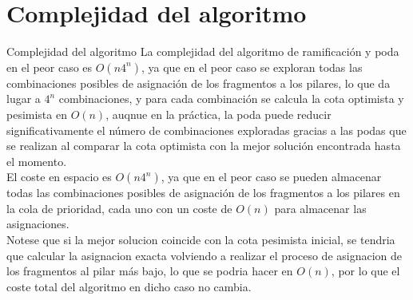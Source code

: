 \documentclass[aspectratio=169]{beamer}
\begin{document}
\section{Complejidad del algoritmo}
\begin{frame}{Complejidad del algoritmo}
    La complejidad del algoritmo de ramificación y poda en el peor caso es $O(n 4^n)$, ya que en el peor caso se exploran todas las combinaciones posibles de asignación de los fragmentos a los pilares, lo que da lugar a $4^n$ combinaciones, y para cada combinación se calcula la cota optimista y pesimista en $O(n)$, auqnue en la práctica, la poda puede reducir significativamente el número de combinaciones exploradas gracias a las podas que se realizan al comparar la cota optimista con la mejor solución encontrada hasta el momento.\\
    El coste en espacio es $O(n4^n)$, ya que en el peor caso se pueden almacenar todas las combinaciones posibles de asignación de los fragmentos a los pilares en la cola de prioridad, cada uno con un coste de $O(n)$ para almacenar las asignaciones.\\
    Notese que si la mejor solucion coincide con la cota pesimista inicial, se tendria que calcular la asignacion exacta volviendo a realizar el proceso de asignacion de los fragmentos al pilar más bajo, lo que se podria hacer en $O(n)$, por lo que el coste total del algoritmo en dicho caso no cambia.
\end{frame}
\end{document}
